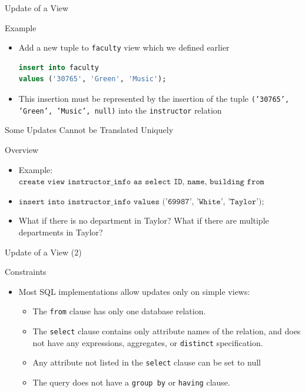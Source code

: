\documentclass[aspectratio=169, xcolor=dvipsnames]{beamer}
\begin{document}
\begin{frame}[fragile]{Update of a View}
    \begin{exampleblock}{Example}
        \begin{itemize}[<+->]
            \item Add a new tuple to \texttt{faculty} view which we defined earlier
            \begin{lstlisting}[language=SQL]
insert into faculty 
values ('30765', 'Green', 'Music');
            \end{lstlisting}
            \item This insertion must be represented by the insertion of the tuple \texttt{('30765', 'Green', 'Music', null)} into the \texttt{instructor} relation
        \end{itemize}
    \end{exampleblock}
\end{frame}

\begin{frame}{Some Updates Cannot be Translated Uniquely}
    \begin{block}{Overview}
        \begin{itemize}[<+->]
            \item Example: $\texttt{create view instructor\_info as select ID, name, building from instructor, department where instructor.dept\_name = department.dept\_name;}$
            \item $\texttt{insert into instructor\_info values ('69987', 'White', 'Taylor');}$
            \item What if there is no department in Taylor? What if there are multiple departments in Taylor?
        \end{itemize}
    \end{block}
\end{frame}

\begin{frame}{Update of a View (2)}
    \begin{block}{Constraints}
        \begin{itemize}[<+->]
            \item Most SQL implementations allow updates only on simple views:
            \begin{itemize}
                \item[$\triangleright$] The \texttt{from} clause has only one database relation.
                \item[$\triangleright$] The \texttt{select} clause contains only attribute names of the relation, and does not have any expressions, aggregates, or \texttt{distinct} specification.
                \item[$\triangleright$] Any attribute not listed in the \texttt{select} clause can be set to null
                \item[$\triangleright$] The query does not have a \texttt{group by} or \texttt{having} clause.
            \end{itemize}
        \end{itemize}
    \end{block}
\end{frame}
\end{document}
